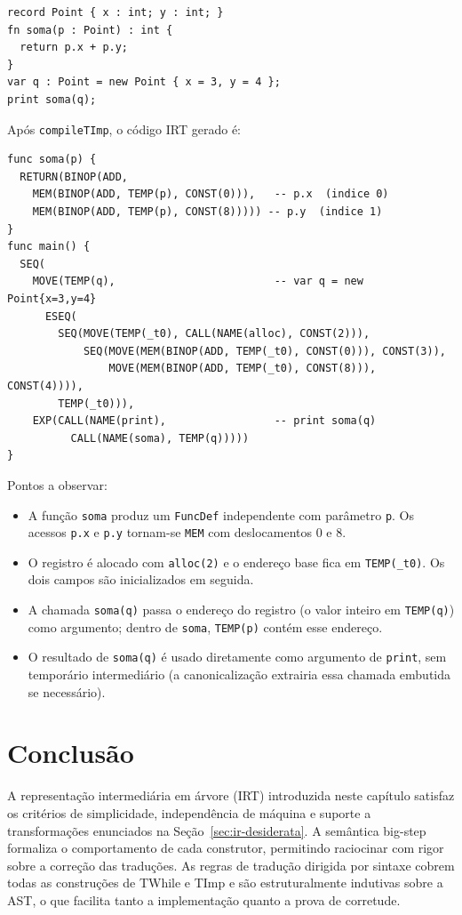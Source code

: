 \begin{verbatim}
record Point { x : int; y : int; }
fn soma(p : Point) : int {
  return p.x + p.y;
}
var q : Point = new Point { x = 3, y = 4 };
print soma(q);
\end{verbatim}

Após \texttt{compileTImp}, o código IRT gerado é:

\begin{verbatim}
func soma(p) {
  RETURN(BINOP(ADD,
    MEM(BINOP(ADD, TEMP(p), CONST(0))),   -- p.x  (indice 0)
    MEM(BINOP(ADD, TEMP(p), CONST(8))))) -- p.y  (indice 1)
}
func main() {
  SEQ(
    MOVE(TEMP(q),                         -- var q = new Point{x=3,y=4}
      ESEQ(
        SEQ(MOVE(TEMP(_t0), CALL(NAME(alloc), CONST(2))),
            SEQ(MOVE(MEM(BINOP(ADD, TEMP(_t0), CONST(0))), CONST(3)),
                MOVE(MEM(BINOP(ADD, TEMP(_t0), CONST(8))), CONST(4)))),
        TEMP(_t0))),
    EXP(CALL(NAME(print),                 -- print soma(q)
          CALL(NAME(soma), TEMP(q)))))
}
\end{verbatim}

Pontos a observar:

\begin{itemize}
  \item A função \texttt{soma} produz um \texttt{FuncDef} independente com
    parâmetro \texttt{p}. Os acessos \texttt{p.x} e \texttt{p.y} tornam-se
    \texttt{MEM} com deslocamentos 0 e 8.
  \item O registro é alocado com \texttt{alloc(2)} e o endereço base fica
    em \texttt{TEMP(\_t0)}. Os dois campos são inicializados em seguida.
  \item A chamada \texttt{soma(q)} passa o endereço do registro (o valor
    inteiro em \texttt{TEMP(q)}) como argumento; dentro de \texttt{soma},
    \texttt{TEMP(p)} contém esse endereço.
  \item O resultado de \texttt{soma(q)} é usado diretamente como argumento
    de \texttt{print}, sem temporário intermediário (a canonicalização
    extrairia essa chamada embutida se necessário).
\end{itemize}

\section{Conclusão}\label{sec:ir-conclusao}

A representação intermediária em árvore (IRT) introduzida neste capítulo
satisfaz os critérios de simplicidade, independência de máquina e suporte a
transformações enunciados na Seção~\ref{sec:ir-desiderata}.
A semântica big-step formaliza o comportamento de cada construtor,
permitindo raciocinar com rigor sobre a correção das traduções.
As regras de tradução dirigida por sintaxe cobrem todas as construções de
TWhile e TImp e são estruturalmente indutivas sobre a AST, o que facilita
tanto a implementação quanto a prova de corretude.

